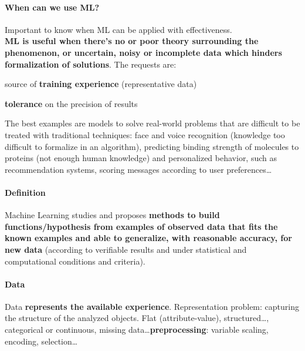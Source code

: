 \documentclass[10pt]{report}
\begin{document}
\paragraph{When can we use ML?} Important to know when ML can be applied with effectiveness.\\
\textbf{ML is useful when there's no or poor theory surrounding the phenomenon, or uncertain, noisy or incomplete data which hinders formalization of solutions}. The requests are: \begin{list}{}{}
	\item source of \textbf{training experience} (representative data)
	\item \textbf{tolerance} on the precision of results
\end{list}
The best examples are models to solve real-world problems that are difficult to be treated with traditional techniques: face and voice recognition (knowledge too difficult to formalize in an algorithm), predicting binding strength of molecules to proteins (not enough human knowledge) and personalized behavior, such as recommendation systems, scoring messages according to user preferences\ldots
\paragraph{Definition} Machine Learning studies and proposes \textbf{methods to build functions/hypothesis from examples of observed data that fits the known examples and able to generalize, with reasonable accuracy, for new data} (according to verifiable results and under statistical and computational conditions and criteria).
\paragraph{Data} Data \textbf{represents the available experience}. Representation problem: capturing the structure of the analyzed objects. Flat (attribute-value), structured\ldots, categorical or continuous, missing data\ldots \textbf{preprocessing}: variable scaling, encoding, selection\ldots
\end{document}
